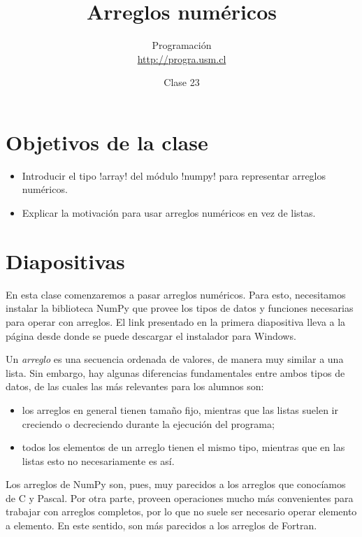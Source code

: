 \documentclass[10pt]{article}
\title{Arreglos numéricos}
\author{Programación \\ \url{http://progra.usm.cl}}
\date{Clase 23}
\begin{document}
  \maketitle

  \section*{Objetivos de la clase}
  \begin{itemize}
    \item Introducir el tipo \li!array!
      del módulo \li!numpy!
      para representar arreglos numéricos.
    \item Explicar la motivación
      para usar arreglos numéricos
      en vez de listas.
  \end{itemize}

  \section*{Diapositivas}


  En esta clase
  comenzaremos a pasar arreglos numéricos.
  Para esto,
  necesitamos instalar la biblioteca NumPy
  que provee los tipos de datos y funciones
  necesarias para operar con arreglos.
  El link presentado en la primera diapositiva
  lleva a la página desde donde se puede descargar
  el instalador para Windows.

  Un \emph{arreglo}
  es una secuencia ordenada de valores,
  de manera muy similar a una lista.
  Sin embargo,
  hay algunas diferencias fundamentales
  entre ambos tipos de datos,
  de las cuales las más relevantes
  para los alumnos son:
  \begin{itemize}
    \item los arreglos en general tienen tamaño fijo,
      mientras que las listas suelen ir creciendo
      o decreciendo durante la ejecución del programa;
    \item todos los elementos de un arreglo
      tienen el mismo tipo, mientras que en las listas
      esto no necesariamente es así.
  \end{itemize}

  Los arreglos de NumPy son, pues,
  muy parecidos a los arreglos que conocíamos
  de C y Pascal.
  Por otra parte,
  proveen operaciones mucho más convenientes
  para trabajar con arreglos completos,
  por lo que no suele ser necesario
  operar elemento a elemento.
  En este sentido,
  son más parecidos a los arreglos de Fortran.
\end{document}

